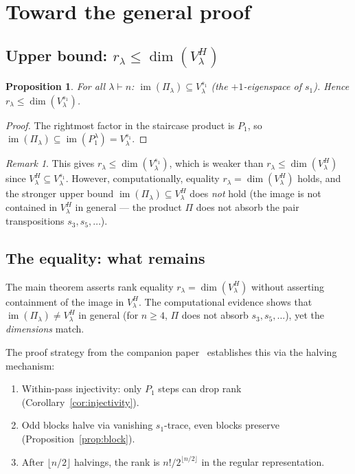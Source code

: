 \documentclass[11pt]{article}
\newtheorem{proposition}[theorem]{Proposition}
\theoremstyle{definition}
\theoremstyle{remark}
\newtheorem{remark}[theorem]{Remark}
\newcommand{\im}{\operatorname{im}}
\begin{document}
\section{Toward the general proof}

\subsection{Upper bound: $r_\lambda \le \dim(V_\lambda^H)$}

\begin{proposition}
\label{prop:upper}
For all $\lambda \vdash n$: $\im(\Pi_\lambda) \subseteq V_\lambda^{s_1}$
(the $+1$-eigenspace of $s_1$). Hence $r_\lambda \le \dim(V_\lambda^{s_1})$.
\end{proposition}

\begin{proof}
The rightmost factor in the staircase product is $P_1$, so
$\im(\Pi_\lambda) \subseteq \im(P_1^\lambda) = V_\lambda^{s_1}$.
\end{proof}

\begin{remark}
This gives $r_\lambda \le \dim(V_\lambda^{s_1})$, which is weaker
than $r_\lambda \le \dim(V_\lambda^H)$ since $V_\lambda^H \subseteq
V_\lambda^{s_1}$. However, computationally, equality
$r_\lambda = \dim(V_\lambda^H)$ holds, and the stronger upper bound
$\im(\Pi_\lambda) \subseteq V_\lambda^H$ does \emph{not} hold
(the image is not contained in $V_\lambda^H$ in general --- the
product $\Pi$ does not absorb the pair transpositions $s_3, s_5, \ldots$).
\end{remark}


\subsection{The equality: what remains}

The main theorem asserts rank equality $r_\lambda = \dim(V_\lambda^H)$
without asserting containment of the image in $V_\lambda^H$. The
computational evidence shows that $\im(\Pi_\lambda) \ne V_\lambda^H$
in general (for $n \ge 4$, $\Pi$ does not absorb $s_3, s_5, \ldots$),
yet the \emph{dimensions} match.

The proof strategy from the companion paper~\cite{rank-injectivity}
establishes this via the halving mechanism:
\begin{enumerate}
  \item Within-pass injectivity: only $P_1$ steps can drop rank
    (Corollary~\ref{cor:injectivity}).
  \item Odd blocks halve via vanishing $s_1$-trace, even blocks preserve
    (Proposition~\ref{prop:block}).
  \item After $\lfloor n/2\rfloor$ halvings, the rank is
    $n!/2^{\lfloor n/2\rfloor}$ in the regular representation.
\end{enumerate}
\end{document}
